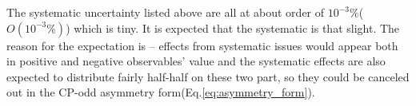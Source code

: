 		The systematic uncertainty listed above are all at about order of $10^{-3}\%$($O(10^{-3}\%)$) which is tiny. It is expected that the systematic is that slight. The reason for the expectation is -- effects from systematic issues would appear both in positive and negative observables' value and the systematic effects are also expected to distribute fairly half-half on these two part, so they could be canceled out in the CP-odd asymmetry form(Eq.\ref{eq:asymmetry_form}).

\FloatBarrier
